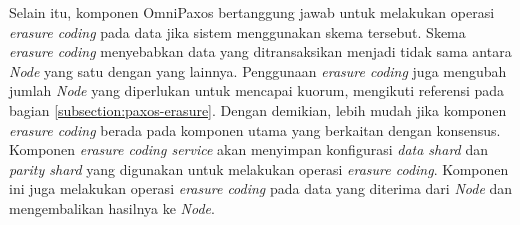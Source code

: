 Selain itu, komponen OmniPaxos bertanggung jawab untuk melakukan operasi \textit{erasure coding} pada data jika sistem menggunakan skema tersebut. Skema \textit{erasure coding} menyebabkan data yang ditransaksikan menjadi tidak sama antara \textit{Node} yang satu dengan yang lainnya. Penggunaan \textit{erasure coding} juga mengubah jumlah \textit{Node} yang diperlukan untuk mencapai kuorum, mengikuti referensi pada bagian \ref{subsection:paxos-erasure}. Dengan demikian, lebih mudah jika komponen \textit{erasure coding} berada pada komponen utama yang berkaitan dengan konsensus. Komponen \textit{erasure coding service} akan menyimpan konfigurasi \textit{data shard} dan \textit{parity shard} yang digunakan untuk melakukan operasi \textit{erasure coding}. Komponen ini juga melakukan operasi \textit{erasure coding} pada data yang diterima dari \textit{Node} dan mengembalikan hasilnya ke \textit{Node}.